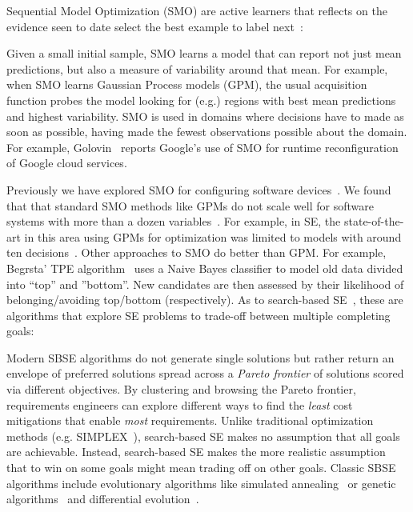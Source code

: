  Sequential Model Optimization (SMO) are   active learners
that reflects on the evidence seen to date  select the best
example to label next~\cite{JMLR:v17:15-047,nair18tse}:
\bi
\item
Given a small initial sample, SMO learns
a model that  can report
not just mean predictions, but also a measure of variability around that mean. 
For example, when SMO  learns
Gaussian Process models (GPM), the usual  acquisition function
 probes the model looking for (e.g.) regions with best mean predictions and highest
variability.
SMO is used in domains where decisions have to made as soon as possible,
having made the fewest  observations possible about the domain.
For example, Golovin~\cite{10.1145/3097983.3098043} reports  Google's
use of SMO for runtime reconfiguration of Google
cloud services.
\item
Previously we have explored SMO for configuring software devices~\cite{JMLR:v17:15-047}.
We found that that standard SMO methods  like
GPMs do not scale well for software systems with more than a dozen variables~\cite{10.5555/3013558.3013569}. For example, in SE, the state-of-the-art in this
area using GPMs for optimization was limited to models
with around ten decisions~\cite{10.5555/3013558.3013569}.
Other approaches to SMO do better than GPM. For example, Begrsta' TPE algorithm~\cite{bergstra2011algorithms}
uses a Naive Bayes
classifier to model old data divided into ``top'' and ''bottom''. New candidates
are then assessed by their likelihood of belonging/avoiding top/bottom (respectively).
\ei
As to search-based SE~\cite{harman2012search}, these
are algorithms that explore
SE problems to   trade-off between multiple completing goals:
\bi
\item
Modern SBSE algorithms do not generate single solutions
but rather return an envelope    of preferred solutions spread across a
{\em Pareto
frontier} of solutions
scored via
  different objectives.
By clustering and browsing the Pareto frontier, requirements engineers  can explore different ways to
find the {\em least} cost mitigations that enable {\em  most} requirements.  Unlike
traditional optimization methods (e.g. SIMPLEX~\cite{nelder1965simplex}),
search-based SE makes no assumption that
all goals are achievable. Instead,
search-based SE makes the more realistic
assumption that to win on some goals might mean
trading off on other goals.
Classic SBSE algorithms include evolutionary
algorithms like simulated annealing~\cite{rothman1942automatic} or genetic algorithms~\cite{holland1992genetic}
and differential evolution~\cite{Storn1997}.
